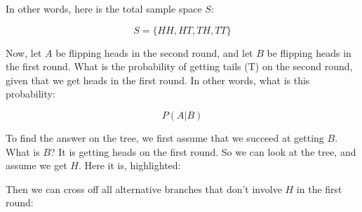 \documentclass[../../../main.tex]{subfiles}
\begin{document}
\noindent
In other words, here is the total sample space $S$:

\begin{equation*}
  S = \{ HH, HT, TH, TT \}
\end{equation*}

\noindent
Now, let $A$ be flipping heads in the second round, and let $B$ be flipping heads in the first round. What is the probability of getting tails (T) on the second round, given that we get heads in the first round. In other words, what is this probability:

\begin{equation*}
  P(A | B)
\end{equation*} 

\noindent
To find the answer on the tree, we first assume that we succeed at getting $B$. What is $B$? It is getting heads on the first round. So we can look at the tree, and assume we get $H$. Here it is, highlighted:

\begin{center}
\end{center}

\noindent
Then we can cross off all alternative branches that don't involve $H$ in the first round:
\end{document}

